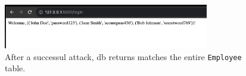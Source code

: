\documentclass{article}
\def\c#1{\texttt{#1}}
\begin{document}
\begin{figure}[hb]
	\centering
	\includegraphics[width=0.8\textwidth]{./figures/attacked.png}
	\caption{After a successul attack, db returns matches the entire \c{Employee} table.}
	\label{fig:attacked}
\end{figure}
\end{document}
